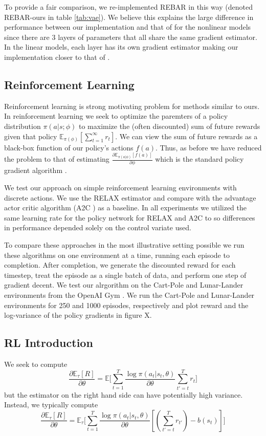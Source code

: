 \documentclass{article}
\newcommand{\E}{\mathbb{E}}
\newcommand{\LL}[1]{\frac{\log \pi(a_{#1}| s_{#1}, \theta)}{\partial \theta}}
\begin{document}
To provide a fair comparison, we re-implemented REBAR in this way (denoted REBAR-ours in table \ref{tab:vae}).
We believe this explains the large difference in performance between our implementation and that of \citep{tucker2017rebar} for the nonlinear models since there are 3 layers of parameters that all share the same gradient estimator.
In the linear models, each layer has its own gradient estimator making our implementation closer to that of \citep{tucker2017rebar}.



\subsection{Reinforcement Learning}
Reinforcement learning is strong motivating problem for methods similar to ours. In reinforcement learning we seek to optimize the paremters of a policy distribution $\pi(a|s;\phi)$ to maximize the (often discounted) sum of future rewards given that policy $\mathbb{E}_{\pi(\phi)}[\sum_{t=1}^{\infty} r_t]$. We can view the sum of future rewards as a black-box function of our policy's actions $f(a)$. Thus, as before we have reduced the problem to that of estimating $\frac{\partial \mathbb{E}_{\pi(a|\phi)}[f(a)]}{\partial \phi}$ which is the standard policy gradient algorithm \cite{POLICY GRADIENT}. 

We test our approach on simple reinforcement learning environments with discrete actions. We use the RELAX estimator and compare with the advantage actor critic algorithm (A2C \cite{A2C}) as a baseline. In all experiments we utilized the same learning rate for the policy network for RELAX and A2C to so differences in performance depended solely on the control variate used. 

To compare these approaches in the most illustrative setting possible we run these algorithms on one environment at a time, running each episode to completion. After completion, we generate the discounted reward for each timestep, treat the episode as a single batch of data, and perform one step of gradient decent. We test our alrgorithm on the Cart-Pole and Lunar-Lander environments from the OpenAI Gym \cite{gym}. We run the Cart-Pole and Lunar-Lander environments for 250 and 1000 episodes, respectively and plot reward and the log-variance of the policy gradients in figure X.

\subsection{RL Introduction}
We seek to compute $$\frac{\partial \E_\tau[R]}{\partial \theta} = \E\Big[\sum_{t=1}^T \LL{t} \sum_{t'=t}^T r_t\Big]$$ but the estimator on the right hand side can have potentially high variance. Instead, we typically compute $$\frac{\partial \E_\tau[R]}{\partial \theta} = \E_\tau\Big[\sum_{t=1}^T \LL{t} [(\sum_{t'=t}^T r_{t'}) - b(s_t)]\Big]$$
\end{document}

